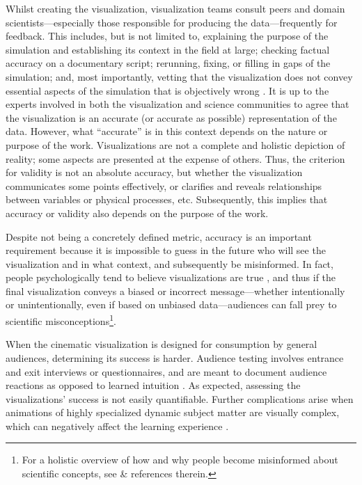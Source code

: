 \documentclass[fleqn,usenatbib,useAMS]{mnras}
\begin{document}
Whilst creating the visualization, visualization teams consult peers and domain scientists---especially those responsible for producing the data---frequently for feedback. This includes, but is not limited to, explaining the purpose of the simulation and establishing its context in the field at large; checking factual accuracy on a documentary script; rerunning, fixing, or filling in gaps of the simulation; and, most importantly, vetting that the visualization does not convey essential aspects of the simulation that is objectively wrong \citep{Borkiewicz17, Borkiewicz19a}. It is up to the experts involved in both the visualization and science communities to agree that the visualization is an accurate (or accurate as possible) representation of the data. However, what ``accurate'' is in this context depends on the nature or purpose of the work. Visualizations are not a complete and holistic depiction of reality; some aspects are presented at the expense of others. Thus, the criterion for validity is not an absolute accuracy, but whether the visualization communicates some points effectively, or clarifies and reveals relationships between variables or physical processes, etc. Subsequently, this implies that accuracy or validity also depends on the purpose of the work. \par

Despite not being a concretely defined metric, accuracy is an important requirement because it is impossible to guess in the future who will see the visualization and in what context, and subsequently be misinformed. In fact, people psychologically tend to believe visualizations are true \citep{Borkiewicz17, Borkiewicz19a}, and thus if the final visualization conveys a biased or incorrect
message---whether intentionally or unintentionally, even if based on unbiased data---audiences can fall prey to scientific misconceptions\footnote{For a holistic overview of how and why people become misinformed about scientific concepts, see \cite{Scheufele2019} \& references therein.}.  \par

When the cinematic visualization is designed for consumption by general audiences, determining its success is harder. Audience testing involves entrance and exit interviews or questionnaires, and are meant to document audience reactions as opposed to learned intuition \citep{Borkiewicz17, Borkiewicz19a}. As expected, assessing the visualizations' success is not easily quantifiable. Further complications arise when animations of highly specialized dynamic subject matter are visually complex, which can negatively affect the learning experience \citep{Lowe03}.  \par
\end{document}
